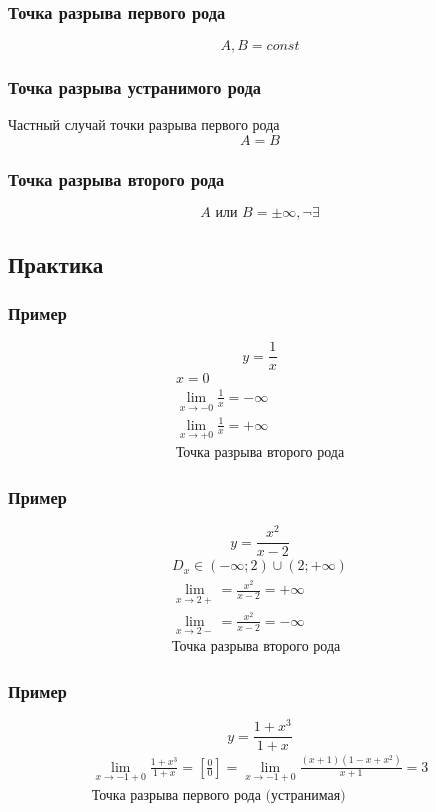 \documentclass{article}
\begin{document}
\subsubsection{Точка разрыва первого рода}
\[
    A, B = const
\]
\subsubsection{Точка разрыва устранимого рода}
Частный случай точки разрыва первого рода
\[
    A = B
\]

\subsubsection{Точка разрыва второго рода}
\[
    A \text{ или } B = \pm \infty, \neg \exists
\]


\subsection{Практика}

\subsubsection{Пример}
\[
    y = \frac{1}{x}
\]
\begin{gather*}
    x = 0 \\
    \lim_{x \to -0} \frac{1}{x} = -\infty \\
    \lim_{x \to +0} \frac{1}{x} = +\infty \\
    \text{Точка разрыва второго рода} 
\end{gather*}

\subsubsection{Пример}
\[
    y = \frac{x^2}{x - 2}
\]
\begin{gather*}
    D_x \in (-\infty; 2) \cup (2; +\infty) \\
    \lim_{x \to 2+} = \frac{x^2}{x - 2} = +\infty \\
    \lim_{x \to 2-} = \frac{x^2}{x - 2} = -\infty \\
    \text{Точка разрыва второго рода}
\end{gather*}

\subsubsection{Пример}
\[
    y = \frac{1 + x^3}{1 + x}
\]
\begin{gather*}
    \lim_{x \to -1 + 0} \frac{1 + x^3}{1 + x} = 
    \left[ \frac{0}{0} \right] =
    \lim_{x \to -1 + 0} \frac{(x + 1)(1 - x + x^2)}{x + 1} = 3 \\
    \text{Точка разрыва первого рода (устранимая)}
\end{gather*}
\end{document}
